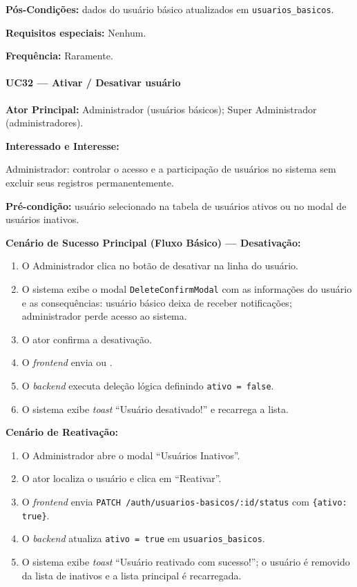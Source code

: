 \textbf{Pós-Condições:} dados do usuário básico
atualizados em \texttt{usuarios\_basicos}.

\textbf{Requisitos especiais:} Nenhum.

\textbf{Frequência:} Raramente.

\paragraph{UC32 --- Ativar / Desativar usuário}\hfill\break

\textbf{Ator Principal:} Administrador (usuários básicos);
Super Administrador (administradores).

\textbf{Interessado e Interesse:}

Administrador: controlar o acesso e a participação de
usuários no sistema sem excluir seus registros
permanentemente.

\textbf{Pré-condição:} usuário selecionado na tabela de
usuários ativos ou no modal de usuários inativos.

\textbf{Cenário de Sucesso Principal (Fluxo Básico) ---
Desativação:}
\begin{enumerate}
  \item O Administrador clica no botão de desativar
        na linha do usuário.
  \item O sistema exibe o modal
        \texttt{DeleteConfirmModal} com as informações
        do usuário e as consequências: usuário básico
        deixa de receber notificações; administrador
        perde acesso ao sistema.
  \item O ator confirma a desativação.
  \item O \textit{frontend} envia
         ou
        .
  \item O \textit{backend} executa deleção lógica
        definindo \texttt{ativo = false}.
  \item O sistema exibe \textit{toast}
        ``Usuário desativado!'' e recarrega a lista.
\end{enumerate}

\textbf{Cenário de Reativação:}
\begin{enumerate}
  \item O Administrador abre o modal
        ``Usuários Inativos''.
  \item O ator localiza o usuário e clica em
        ``Reativar''.
  \item O \textit{frontend} envia
        \texttt{PATCH /auth/usuarios-basicos/:id/status}
        com \texttt{\{ativo: true\}}.
  \item O \textit{backend} atualiza \texttt{ativo = true}
        em \texttt{usuarios\_basicos}.
  \item O sistema exibe \textit{toast}
        ``Usuário reativado com sucesso!''; o usuário
        é removido da lista de inativos e a lista
        principal é recarregada.
\end{enumerate}

